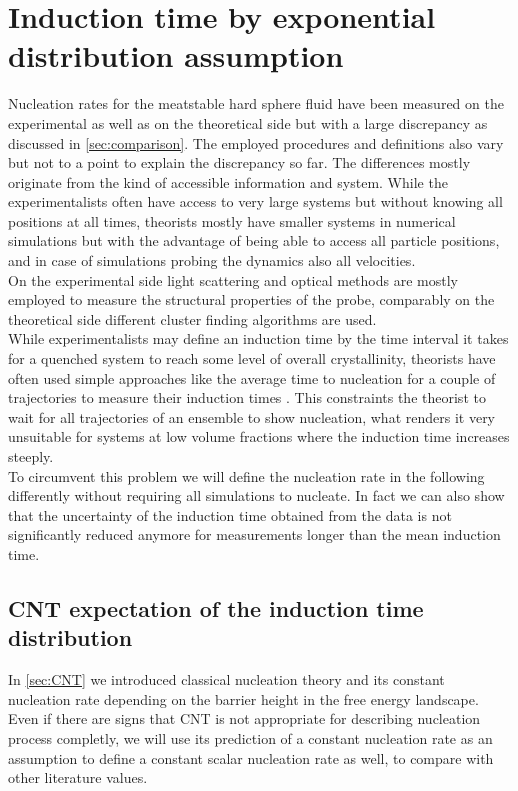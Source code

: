 \section{Induction time by exponential distribution assumption}
\label{sec:induction_times}
Nucleation rates for the meatstable hard sphere fluid have been measured on the experimental as well as on the theoretical side but with a large discrepancy as discussed in \autoref{sec:comparison}. The employed procedures and definitions also vary but not to a point to explain the discrepancy so far. The differences mostly originate from the kind of accessible information and system. While the experimentalists often have access to very large systems but without knowing all positions at all times, theorists mostly have smaller systems in numerical simulations but with the advantage of being able to access all particle positions, and in case of simulations probing the dynamics also all velocities.\\
On the experimental side light scattering and optical methods are mostly employed to measure the structural properties of the probe, comparably on the theoretical side different cluster finding algorithms are used.\\

While experimentalists may define an induction time by the time interval it takes for a quenched system to reach some level of overall crystallinity, theorists have often used simple approaches like the average time to nucleation for a couple of trajectories to measure their induction times\cite{Filion2010a} . This constraints the theorist to wait for all trajectories of an ensemble to show nucleation, what renders it very unsuitable for systems at low volume fractions where the induction time increases steeply.\\

To circumvent this problem we will define the nucleation rate in the following differently without requiring all simulations to nucleate. In fact we can also show that the uncertainty of the induction time obtained from the data is not significantly reduced anymore for measurements longer than the mean induction time.\\

\subsection{CNT expectation of the induction time distribution}
\label{sec:induction_time_expectation}
In \autoref{sec:CNT} we introduced classical nucleation theory and its constant nucleation rate depending on the barrier height in the free energy landscape. Even if there are signs that CNT is not appropriate for describing nucleation process completly, we will use its prediction of a constant nucleation rate as an assumption to define a constant scalar nucleation rate as well, to compare with other literature values.\\


